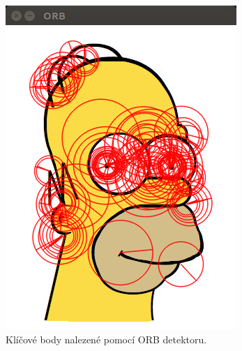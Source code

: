 \documentclass[12pt, a4paper]{article}
\begin{document}
\begin{figure}[!ht]
\begin{minipage}[t]{0.49\textwidth}
		\includegraphics[width = \textwidth]{./orb.png}
		\caption{Klíčové body nalezené pomocí ORB detektoru.}
	\end{minipage}%
\end{figure}
\end{document}
